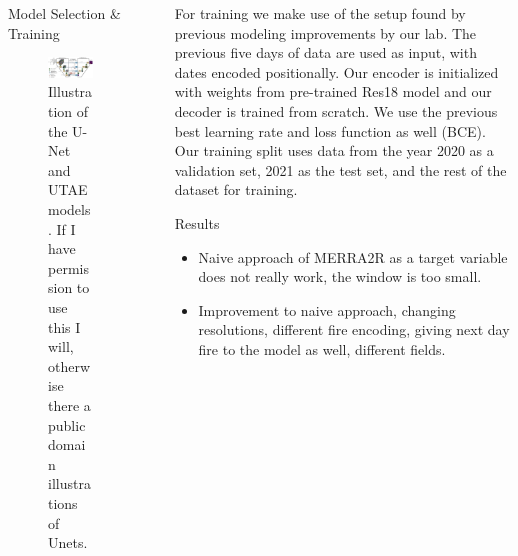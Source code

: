 \documentclass[final]{beamer}
\newlength{\sepwidth}
\newlength{\colwidth}
\newcommand{\separatorcolumn}{\begin{column}{\sepwidth}\end{column}}
\begin{document}
\begin{frame}[t]
\begin{columns}[t]
\begin{column}{\colwidth}
\begin{block}{Model Selection \& Training}
  \begin{figure}
        \centering
        \includegraphics[width=0.6\linewidth]{x2.png}
        \caption{Illustration of the U-Net and UTAE models. If I have permission to use this I will, otherwise there a public domain illustrations of Unets.}
        \label{fig:placeholder}
\end{figure}
 

 

 


\end{block}


\end{column}

\separatorcolumn

\begin{column}{\colwidth}

For training we make use of the setup found by previous modeling improvements by our lab. The previous five days of data are used as input, with dates encoded positionally. Our encoder is initialized with weights from pre-trained Res18 model and our decoder is trained from scratch. We use the previous best learning rate and loss function as well (BCE). Our training split uses data from the year 2020 as a validation set, 2021 as the test set, and the rest of the dataset for training. 




  \begin{block}{Results}

  \begin{itemize}
    \item Naive approach of MERRA2R as a target variable does not really work, the window is too small.
    \item Improvement to naive approach, changing resolutions, different fire encoding, giving next day fire to the model as well, different fields.
\end{itemize}
    

  \end{block}



\end{column}
\end{columns}
\end{frame}
\end{document}
